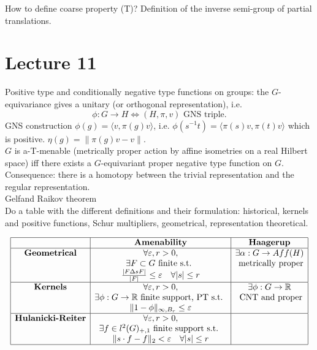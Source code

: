 How to define coarse property (T)? Definition of the inverse semi-group of partial translations.
\section{Lecture 11}
Positive type and conditionally negative type functions on groups: the $G$-equivariance gives a unitary (or orthogonal representation), i.e.
\[\phi: G\rightarrow H \iff (H,\pi,v) \text{ GNS triple}.\] 
GNS construction $\phi(g) = \langle v,\pi(g)v\rangle$, i.e. $\phi(s^{-1}t) = \langle \pi(s)v,\pi(t)v\rangle$ which is positive. $\eta(g)= \|\pi(g)v -v\|$. \\

$G$ is a-T-menable (metrically proper action by affine isometries on a real Hilbert space) iff there exists a $G$-equivariant proper negative type function on $G$.\\

Consequence: there is a homotopy between the trivial representation and the regular representation.\\

Gelfand Raikov theorem\\

Do a table with the different definitions and their formulation: historical, kernels and positive functions, Schur multipliers, geometrical, representation theoretical.

\begin{table}[h]
\[\begin{array}{|c|c|c|}
\hline
                                                     & \textbf{Amenability} & \textbf{Haagerup}   \\
\hline
\textbf{Geometrical} &  
		\forall \varepsilon, r>0,   & 
		\exists \alpha : G \rightarrow Aff(H)  \\ 
			& \exists F\subset G \text{ finite s.t. }  & \text{ metrically proper} \\
			& \frac{|F\Delta s F|}{|F|}\leq \varepsilon \quad \forall |s|\leq r & \\
\hline
\textbf{Kernels} &
		\forall \varepsilon, r>0, &
		\exists \phi: G\rightarrow \mathbb R  \\
			&\exists \phi: G \rightarrow \mathbb R \text{ finite support, PT s.t. } & \text{ CNT and proper} \\
			& \|1-\phi\|_{\infty,B_r}\leq \varepsilon  & \\
\hline
\textbf{Hulanicki-Reiter} &
		\forall \varepsilon, r>0, &
		\\
			&\exists f\in l^2(G)_{+,1}\text{ finite support s.t. } & \\
		&  \|s\cdot f -f\|_2< \varepsilon \quad \forall |s|\leq r & \\
\hline
\end{array}\]
\end{table} 

